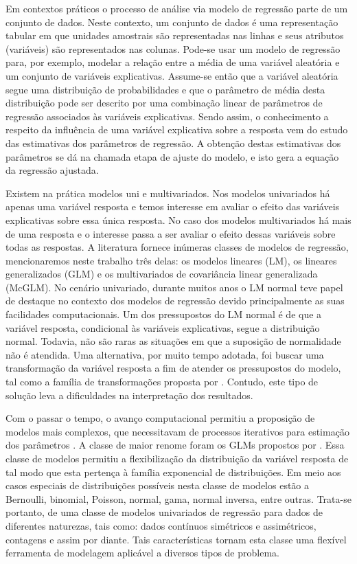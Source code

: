 Em contextos práticos o processo de análise via modelo de regressão parte de um conjunto de dados. Neste contexto, um conjunto de dados é uma representação tabular em que unidades amostrais são representadas nas linhas e seus atributos (variáveis) são representados nas colunas. Pode-se usar um modelo de regressão para, por exemplo, modelar a relação entre a média de uma variável aleatória e um conjunto de variáveis explicativas. Assume-se então que a variável aleatória segue uma distribuição de probabilidades e que o parâmetro de média desta distribuição pode ser descrito por uma combinação linear de parâmetros de regressão associados às variáveis explicativas. Sendo assim, o conhecimento a respeito da influência de uma variável explicativa sobre a resposta vem do estudo das estimativas dos parâmetros de regressão. A obtenção destas estimativas dos parâmetros se dá na chamada etapa de ajuste do modelo, e isto gera a equação da regressão ajustada.

Existem na prática modelos uni e multivariados. Nos modelos univariados há apenas uma variável resposta e temos interesse em avaliar o efeito das variáveis explicativas sobre essa única resposta. No caso dos modelos multivariados há mais de uma resposta e o interesse passa a ser avaliar o efeito dessas variáveis sobre todas as respostas. A literatura fornece inúmeras classes de modelos de regressão, mencionaremos neste trabalho três delas: os modelos lineares (LM), os lineares generalizados (GLM) e os multivariados de covariância linear generalizada (McGLM). No cenário univariado, durante muitos anos o LM normal \citep{galton} teve papel de destaque no contexto dos modelos de regressão devido principalmente as suas facilidades computacionais. Um dos pressupostos do LM normal é de que a variável resposta, condicional às variáveis explicativas, segue a distribuição normal. Todavia, não são raras as situações em que a suposição de normalidade não é atendida. Uma alternativa, por muito tempo adotada, foi buscar uma transformação da variável resposta a fim de atender os pressupostos do modelo, tal como a família de transformações proposta por \citet{boxcox64}. Contudo, este tipo de solução leva a dificuldades na interpretação dos resultados.

Com o passar o tempo, o avanço computacional permitiu a proposição de modelos mais complexos, que necessitavam de processos iterativos para estimação dos parâmetros \citep{paula}. A classe de maior renome foram os GLMs propostos por \citet{Nelder72}. Essa classe de modelos permitiu a flexibilização da distribuição da variável resposta de tal modo que esta pertença à família exponencial de distribuições. Em meio aos casos especiais de distribuições possíveis nesta classe de modelos estão a Bernoulli, binomial, Poisson, normal, gama, normal inversa, entre outras. Trata-se portanto, de uma classe de modelos univariados de regressão para dados de diferentes naturezas, tais como: dados contínuos simétricos e assimétricos, contagens e assim por diante. Tais características tornam esta classe uma flexível ferramenta de modelagem aplicável a diversos tipos de problema. 

